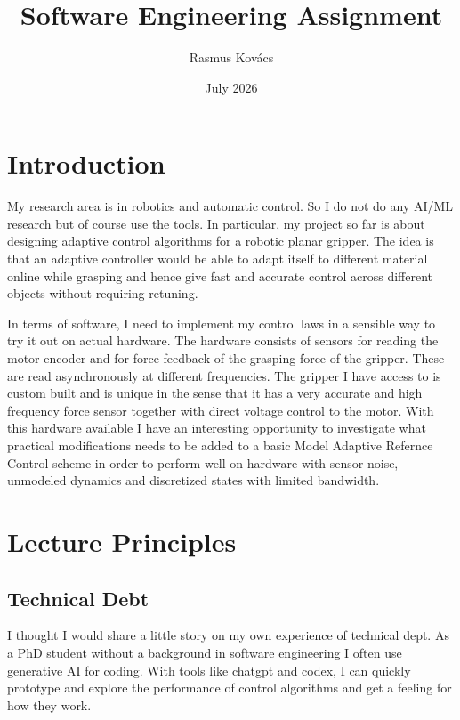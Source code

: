 \documentclass[11pt]{article}
\title{Software Engineering Assignment}
\author{Rasmus Kovács}
\date{July 2026}
\begin{document}
\maketitle

\section{Introduction}
My research area is in robotics and automatic control. So I do not do any AI/ML research but of course use the tools. In particular, my project so far is about designing adaptive control algorithms for a robotic planar gripper. The idea is that an adaptive controller would be able to adapt itself to different material online while grasping and hence give fast and accurate control across different objects without requiring retuning. 

In terms of software, I need to implement my control laws in a sensible way to try it out on actual hardware. The hardware consists of sensors for reading the motor encoder and for force feedback of the grasping force of the gripper. These are read asynchronously at different frequencies. The gripper I have access to is custom built and is unique in the sense that it has a very accurate and high frequency force sensor together with direct voltage control to the motor. With this hardware available I have an interesting opportunity to investigate what practical modifications needs to be added to a basic Model Adaptive Refernce Control scheme in order to perform well on hardware with sensor noise, unmodeled dynamics and discretized states with limited bandwidth.


\section{Lecture Principles}
\subsection{Technical Debt}
I thought I would share a little story on my own experience of technical dept. As a PhD student without a background in software engineering I often use generative AI for coding. With tools like chatgpt and codex, I can quickly prototype and explore the performance of control algorithms and get a feeling for how they work. 
\end{document}
